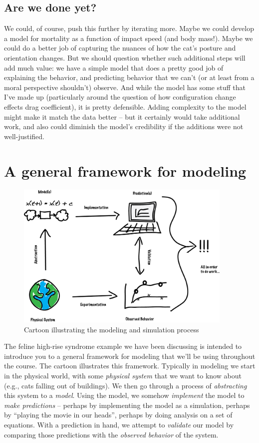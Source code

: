 \subsection{Are we done yet?}

We could, of course, push this further by iterating more.  Maybe we could develop a model for mortality as a function of impact speed (and body mass!).  Maybe we could do a better job of capturing the nuances of how the cat's posture and orientation changes.  But we should question whether such additional steps will add much value:  we have a simple model that does a pretty good job of explaining the behavior, and predicting behavior that we can't (or at least from a moral perspective shouldn't) observe.  And while the model has some stuff that I've made up (particularly around the question of how configuration change effects drag coefficient), it is pretty defensible.  Adding complexity to the model might make it match the data better -- but it certainly would take additional work, and also could diminish the model's credibility if the additions were not well-justified.

\section{A general framework for modeling}

\begin{figure}

\centerline{\includegraphics[height=7cm]{figs/LabeledModsimDiagram}}

\caption{Cartoon illustrating the modeling and simulation process}
\end{figure}

The feline high-rise syndrome example we have been discussing is intended to introduce you to a general framework for modeling that we'll be using throughout the course.  The cartoon illustrates this framework. Typically in modeling we start in the physical world, with some {\it physical system} that we want to know about (e.g., cats falling out of buildings).  We then go through a process of {\it abstracting} this system to a {\it model}.  Using the model, we somehow {\it implement} the model to {\it make predictions} -- perhaps by implementing the model as a simulation, perhaps by ``playing the movie in our heads'', perhaps by doing analysis on a set of equations.  With a prediction in hand, we attempt to {\it validate} our model by comparing those predictions with the {\it observed behavior} of the system. 

